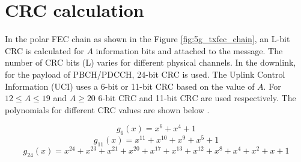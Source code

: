 \section{CRC calculation}
In the polar FEC chain as shown in the Figure \ref{fig:5g_txfec_chain}, an L-bit CRC is calculated for $A$ information bits and attached to the message. The number of CRC bits (L) varies for different physical channels. In the downlink, for the payload of PBCH/PDCCH, 24-bit CRC is used. The Uplink Control Information (UCI) uses a 6-bit or 11-bit CRC based on the value of $A$. For $12 \leq A \leq 19$ and $A \geq 20$ 6-bit CRC and 11-bit CRC are used respectively. The polynomials for different CRC values are shown below \cite{3gpp.38.212}.

\begin{equation} \label{crc_polynomial6}
g_{6}(x) = x^{6} + x^{4} + 1
\end{equation}
\begin{equation} \label{crc_polynomial11}
g_{11}(x) = x^{11} + x^{10} + x^{9} + x^{5} + 1
\end{equation}
\begin{equation} \label{crc_polynomial24}
g_{24}(x) = x^{24} + x^{23} + x^{21} + x^{20} + x^{17} + x^{13} + x^{12} + x^{8} + x^{4} + x^{2} + x + 1
\end{equation}

